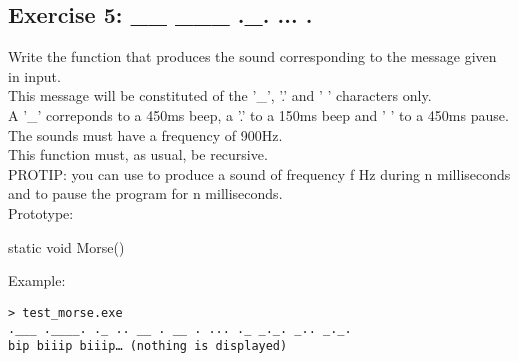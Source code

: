 \subsection{Exercise 5: \_\_ \_\_\_ .\_. ... .}

Write the  function that produces the sound corresponding to the message given in input.\\
This message will be constituted of the '\_', '.' and ' ' characters only.\\
A '\_' correponds to a 450ms beep, a '.' to a 150ms beep and ' ' to a 450ms pause.\\
The sounds must have a frequency of 900Hz.\\
This function must, as usual, be recursive.\\
PROTIP: you can use  to produce a sound of frequency f Hz during n milliseconds
and  to pause the program for n milliseconds.\\

Prototype:
\begin{code}
static void Morse()
\end{code}

Example:
\begin{verbatim}
> test_morse.exe
.___ .____. ._ .. __ . __ . ... ._ _._. _.. _._.
bip biiip biiip… (nothing is displayed)
\end{verbatim}
